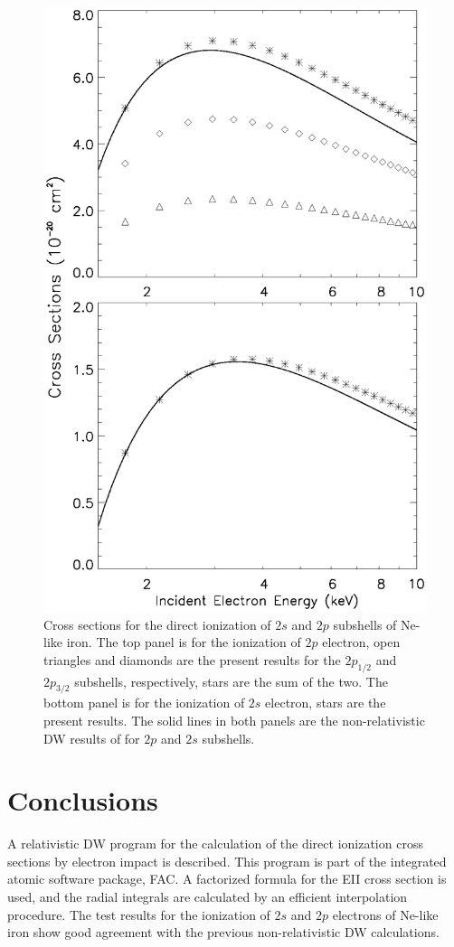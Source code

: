 \documentclass{elsart}
\begin{document}
\begin{figure}
\includegraphics[width=5in]{ion0.eps}
\caption{\label{fig_comparison}Cross sections for the direct
ionization of $2s$ and $2p$ subshells of Ne-like iron. The top panel is for
the ionization of $2p$ electron, open triangles and diamonds are the
present results for the $2p_{1/2}$ and $2p_{3/2}$ subshells, respectively,
stars are the sum of the two. The bottom panel is for the ionization of $2s$
electron, stars are the present results. The solid lines in both panels are
the non-relativistic DW results of \citet{younger82} for $2p$ and $2s$
subshells.} 
\end{figure}

\section{Conclusions}
A relativistic DW program for the calculation of the direct ionization cross
sections by electron impact is described.  This program is part of the
integrated atomic software package, FAC. A factorized formula for the EII
cross section is used, and the radial integrals are calculated by an efficient
interpolation procedure. The test results for the ionization of $2s$ and $2p$
electrons of Ne-like iron show good agreement with the previous
non-relativistic DW calculations. 
\end{document}
